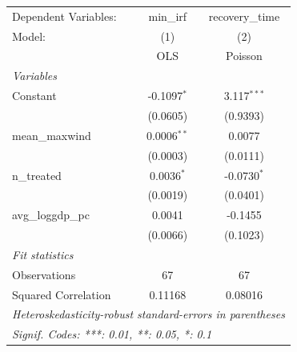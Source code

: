 
\begingroup
\centering
\begin{tabular}{lcc}
   \tabularnewline \midrule \midrule
   Dependent Variables: & min\_irf      & recovery\_time\\   
   Model:               & (1)           & (2)\\  
                        &  OLS          & Poisson\\  
   \midrule
   \emph{Variables}\\
   Constant             & -0.1097$^{*}$ & 3.117$^{***}$\\   
                        & (0.0605)      & (0.9393)\\   
   mean\_maxwind        & 0.0006$^{**}$ & 0.0077\\   
                        & (0.0003)      & (0.0111)\\   
   n\_treated           & 0.0036$^{*}$  & -0.0730$^{*}$\\   
                        & (0.0019)      & (0.0401)\\   
   avg\_loggdp\_pc      & 0.0041        & -0.1455\\   
                        & (0.0066)      & (0.1023)\\   
   \midrule
   \emph{Fit statistics}\\
   Observations         & 67            & 67\\  
   Squared Correlation  & 0.11168       & 0.08016\\  
   \midrule \midrule
   \multicolumn{3}{l}{\emph{Heteroskedasticity-robust standard-errors in parentheses}}\\
   \multicolumn{3}{l}{\emph{Signif. Codes: ***: 0.01, **: 0.05, *: 0.1}}\\
\end{tabular}
\par\endgroup


